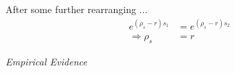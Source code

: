 \begin{frame}
After some further rearranging ...
\begin{align*}
e^{(\rho_s - r)s_1} & = e^{(\rho_s - r) s_2} \\
\Rightarrow \rho_s  & = r
\end{align*}
\end{frame}

\begin{frame}\begin{center}
\LARGE\textit{Empirical Evidence}
\end{center}\end{frame}
\begin{frame}[plain]
\begin{center}
\end{center}
\end{frame}

\begin{frame}[plain]
\begin{center}
\end{center}
\end{frame}

\begin{frame}[plain]
\begin{center}
\end{center}
\end{frame}

\begin{frame}[plain]
\begin{center}
\end{center}
\end{frame}

\begin{frame}[plain]
\begin{center}
\end{center}
\end{frame}

\begin{frame}[plain]
\begin{center}
\end{center}
\end{frame}

